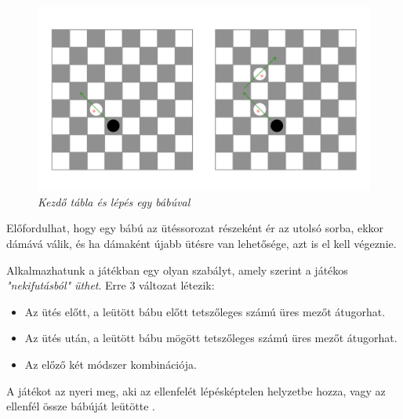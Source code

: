 \begin{figure}[!h]
	\centering
	\includegraphics[width=0.8\linewidth]{kepek/checkers_board2.png}
	\caption{\textit{Kezdő tábla és lépés egy bábúval}}
	\label{fig:checkers_board2}
\end{figure}

Előfordulhat, hogy egy bábú az ütéssorozat részeként ér az utolsó sorba, ekkor dámává válik, és ha dámaként újabb ütésre van lehetősége, azt is el kell végeznie.


Alkalmazhatunk a játékban egy olyan szabályt, amely szerint a játékos \textit{"nekifutásból" üthet}. Erre 3 változat létezik:

\begin{itemize}
	\item Az ütés előtt, a leütött bábu előtt tetszőleges számú üres mezőt átugorhat.
	\item Az ütés után, a leütött bábu mögött tetszőleges számú üres mezőt átugorhat.
	\item Az előző két módszer kombinációja.
\end{itemize}


A játékot az nyeri meg, aki az ellenfelét lépésképtelen helyzetbe hozza, vagy az ellenfél össze bábúját leütötte \cite{checkers-rules}.




